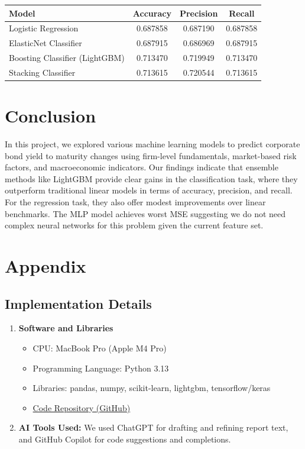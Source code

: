 \documentclass[12pt]{article}
\begin{document}
\begin{singlespace}
\begin{table}[H]
\centering
\begin{tabular}{lccc}
\toprule
\textbf{Model} & \textbf{Accuracy} & \textbf{Precision} & \textbf{Recall} \\
\midrule
Logistic Regression & 0.687858 & 0.687190 & 0.687858 \\
ElasticNet Classifier & 0.687915 & 0.686969 & 0.687915 \\
Boosting Classifier (LightGBM) & 0.713470 & 0.719949 & 0.713470 \\
Stacking Classifier & 0.713615 & 0.720544 & 0.713615 \\
\bottomrule
\end{tabular}
\end{table}
\end{singlespace}

\section{Conclusion}
In this project, we explored various machine learning models to predict corporate bond yield to maturity changes using firm-level fundamentals, market-based risk factors, and macroeconomic indicators. Our findings indicate that ensemble methods like LightGBM provide clear gains in the classification task, where they outperform traditional linear models in terms of accuracy, precision, and recall. For the regression task, they also offer modest improvements over linear benchmarks. The MLP model achieves worst MSE suggesting we do not need complex neural networks for this problem given the current feature set.

\appendix
\section{Appendix}

\subsection{Implementation Details}

\begin{enumerate}
    \item \textbf{Software and Libraries}
    \begin{itemize}
        \item CPU: MacBook Pro (Apple M4 Pro)
        \item Programming Language: Python 3.13
        \item Libraries: pandas, numpy, scikit-learn, lightgbm, tensorflow/keras
        \item \href{https://github.com/QinqinAndMacaulayCat/ml_project}{Code Repository (GitHub)}
    \end{itemize}

    \item \textbf{AI Tools Used: } We used ChatGPT for drafting and refining report text, and GitHub Copilot for code suggestions and completions.
\end{enumerate}
\end{document}
